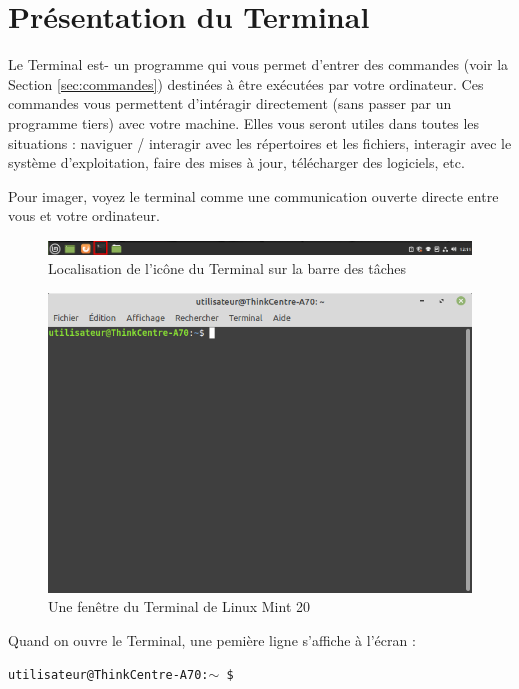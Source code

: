 \documentclass[12pt]{book}
\begin{document}
\section{Présentation du Terminal}
	Le Terminal est- un programme qui vous permet d'entrer des commandes  (voir la Section \ref{sec:commandes}) destinées à être exécutées par votre ordinateur.
	Ces commandes vous permettent d'intéragir directement (sans passer par un programme tiers) avec votre machine.
	Elles vous seront utiles dans toutes les situations : naviguer / interagir avec les répertoires et les fichiers, interagir avec le système d'exploitation, faire des mises à jour, télécharger des logiciels, etc.\par
	Pour imager, voyez le terminal comme une communication ouverte directe entre vous et votre ordinateur.
	\begin{figure}[h]
		\centering
		\includegraphics[width=\textwidth]{include/terminal_barre.png}
		\caption{Localisation de l'icône du Terminal sur la barre des tâches}
		\label{fig:terminal_barre}
	\end{figure}
	\begin{figure}[h]
		\centering
		\includegraphics[width=\textwidth]{include/terminal.png}
		\caption{Une fenêtre du Terminal de Linux Mint 20}
		\label{fig:terminal_ouvert}
	\end{figure}\par
	Quand on ouvre le Terminal, une pemière ligne s'affiche à l'écran :
	\begin{center}
		\texttt{utilisateur@ThinkCentre-A70:$\sim$ \$ }
	\end{center}
\end{document}

